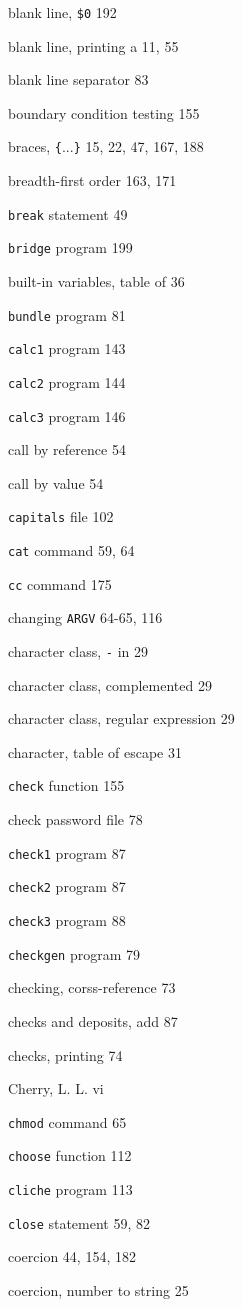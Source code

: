 \begin{multicols}{3}
blank line, \verb'$0' 192

blank line, printing a 11, 55

blank line separator 83

boundary condition testing 155

braces, \verb'{'...\verb'}' 15, 22, 47, 167, 188

breadth-first order 163, 171

\verb'break' statement 49

\verb'bridge' program 199

built-in variables, table of 36

\verb'bundle' program 81

\verb'calc1' program 143

\verb'calc2' program 144

\verb'calc3' program 146

call by reference 54

call by value 54

\verb'capitals' file 102

\verb'cat' command 59, 64

\verb'cc' command 175

changing \verb'ARGV' 64-65, 116

character class, \verb'-' in 29

character class, complemented 29

character class, regular expression 29

character, table of escape 31

\verb'check' function 155

check password file 78

\verb'check1' program 87

\verb'check2' program 87

\verb'check3' program 88

\verb'checkgen' program 79

checking, corss-reference 73

checks and deposits, add 87

checks, printing 74

Cherry, L. L. vi

\verb'chmod' command 65

\verb'choose' function 112

\verb'cliche' program 113

\verb'close' statement 59, 82

coercion 44, 154, 182

coercion, number to string 25


\end{multicols}
